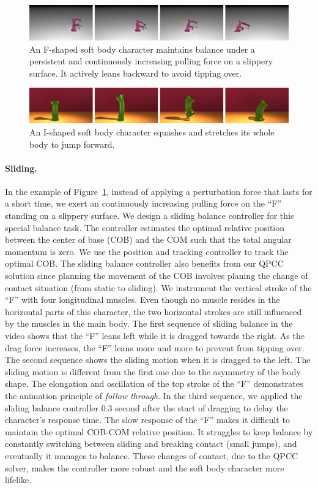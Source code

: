 \begin{figure}[t]
\centering
\includegraphics[width=\textwidth]{figures/FBalance.eps}
\caption{An F-shaped soft body character maintains balance under a persistent and continuously increasing pulling force on a slippery surface. It actively leans backward to avoid tipping over.}
\label{fig:FBalance}
\end{figure}

\begin{figure}[t]
\centering
\includegraphics[width=\textwidth]{figures/IJump.eps}
\caption{An I-shaped soft body character squashes and stretches its whole body to jump forward.}
\label{fig:IJump}
\end{figure}


\paragraph{Sliding.} In the example of Figure~\ref{fig:FBalance},
instead of applying a perturbation force that lasts for a short time,
we exert an continuously increasing pulling force on the ``F'' standing on
a slippery surface. We design a sliding balance controller for this
special balance task. The controller estimates the optimal relative
position between the center of base (COB) and the COM such that the
total angular momentum is zero. We use the position and tracking controller to track the optimal COB. The sliding balance controller also benefits from our QPCC
solution since planning the movement of the COB involves planing the
change of contact situation (from static to sliding).  We instrument the vertical stroke of the ``F'' with four
longitudinal muscles. Even though no muscle resides in the horizontal
parts of this character, the two horizontal strokes are still
influenced by the muscles in the main body. The first sequence of
sliding balance in the video shows that the ``F'' leans left while it is
dragged towards the right.  As the drag force increases, the ``F'' leans more
and more to prevent from tipping over. The second sequence shows the
sliding motion when it is dragged to the left. The sliding motion is
different from the first one due to the asymmetry of the body
shape. The elongation and oscillation of the top stroke of the ``F''
demonstrates the animation principle of \emph{follow through}. In the
third sequence, we applied the sliding balance controller 0.3 second
after the start of dragging to delay the character's
response time. The slow response of the ``F'' makes it difficult to
maintain the optimal COB-COM relative position. It struggles to keep
balance by constantly switching between sliding and breaking contact
(small jumps), and eventually it manages to balance.  These changes of
contact, due to the QPCC solver, makes the controller more robust and
the soft body character more lifelike.

